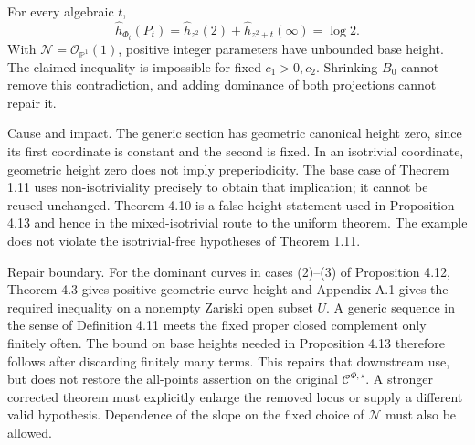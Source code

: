 \documentclass[10pt]{article}
\begin{document}
For every algebraic \(t\), \[\widehat h_{\Phi_t}(P_t)
 =\widehat h_{z^2}(2)+\widehat h_{z^2+t}(\infty)=\log 2.\] With \(\mathcal N=\mathcal O_{\mathbb P^1}(1)\), positive integer parameters have unbounded base height. The claimed inequality is impossible for fixed \(c_1>0,c_2\). Shrinking \(B_0\) cannot remove this contradiction, and adding dominance of both projections cannot repair it.\par
Cause and impact. The generic section has geometric canonical height zero, since its first coordinate is constant and the second is fixed. In an isotrivial coordinate, geometric height zero does not imply preperiodicity. The base case of Theorem 1.11 uses non-isotriviality precisely to obtain that implication; it cannot be reused unchanged. Theorem 4.10 is a false height statement used in Proposition 4.13 and hence in the mixed-isotrivial route to the uniform theorem. The example does not violate the isotrivial-free hypotheses of Theorem 1.11.\par
Repair boundary. For the dominant curves in cases (2)–(3) of Proposition 4.12, Theorem 4.3 gives positive geometric curve height and Appendix A.1 gives the required inequality on a nonempty Zariski open subset \(U\). A generic sequence in the sense of Definition 4.11 meets the fixed proper closed complement only finitely often. The bound on base heights needed in Proposition 4.13 therefore follows after discarding finitely many terms. This repairs that downstream use, but does not restore the all-points assertion on the original \(\mathcal C^{\Phi,\star}\). A stronger corrected theorem must explicitly enlarge the removed locus or supply a different valid hypothesis. Dependence of the slope on the fixed choice of \(\mathcal N\) must also be allowed.\par
\end{document}
